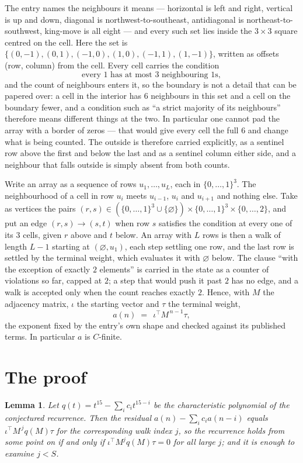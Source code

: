 \documentclass[11pt,a4paper]{article}
\theoremstyle{plain}
\newtheorem{lemma}[theorem]{Lemma}
\theoremstyle{definition}
\begin{document}
The entry names the neighbours it means --- horizontal is left and right, vertical is up and
down, diagonal is northwest-to-southeast, antidiagonal is northeast-to-southwest, king-move is
all eight --- and every such set lies inside the $3\times3$ square centred on the cell. Here
the set is $\{(0,-1), (0,1), (-1,0), (1,0), (-1,1), (1,-1)\}$, written as offsets (row, column) from the cell. Every cell carries
the condition
\[
\text{every 1 has at most 3 neighbouring 1s},
\]
and the count of neighbours enters it, so the boundary is not a detail that can be papered
over: a cell in the interior has $6$ neighbours in this set and a cell on the boundary
fewer, and a condition such as ``a strict majority of its neighbours'' therefore means
different things at the two. In particular one cannot pad the array with a border of zeros ---
that would give every cell the full $6$ and change what is being counted. The outside is
therefore carried
explicitly, as a sentinel row above the first and below the last and as a sentinel column
either side, and a neighbour that falls outside is simply absent from both counts.

Write an array as a sequence of rows $u_1,\dots,u_L$, each in
$\{0,\dots,1\}^{3}$. The neighbourhood of a cell in row $u_i$ meets $u_{i-1}$,
$u_i$ and $u_{i+1}$ and nothing else. Take as vertices the pairs
$(r,s)\in(\{0,\dots,1\}^{3}\cup\{\varnothing\})\times\{0,\dots,1\}^{3} \times \{0,\dots,2\}$,
and put an edge $(r,s)\to(s,t)$ when row $s$ satisfies the condition at every one of its
$3$ cells, given $r$ above and $t$ below. An array with $L$ rows is then a walk of length
$L-1$ starting at $(\varnothing,u_1)$, each step settling one row, and the last row is
settled by the terminal weight, which evaluates it with $\varnothing$ below. The clause ``with the exception of exactly $2$ elements'' is carried in
the state as a counter of violations so far, capped at $2$; a step that would push it past
$2$ has no edge, and a walk is accepted only when the count reaches exactly $2$. Hence,
with $M$ the adjacency matrix, $\iota$ the starting vector and $\tau$ the terminal weight,
\[
a(n)\;=\;\,\iota^{\!\top}M^{\,n-1}\tau ,
\]
the exponent fixed by the entry's own shape and checked against its published terms. In
particular $a$ is $C$-finite.

\section{The proof}

\begin{lemma}\label{lem:crit}
Let $q(t)=t^{15}-\sum_i c_it^{15-i}$ be the characteristic polynomial of the
conjectured recurrence. Then the residual $a(n)-\sum_ic_ia(n-i)$ equals
$\iota^{\!\top}M^{\,j}q(M)\tau$ for the corresponding walk index $j$, so the
recurrence holds from some point on if and only if $\iota^{\!\top}M^{j}q(M)\tau=0$ for all
large $j$; and it is enough to examine $j<S$.
\end{lemma}
\end{document}
